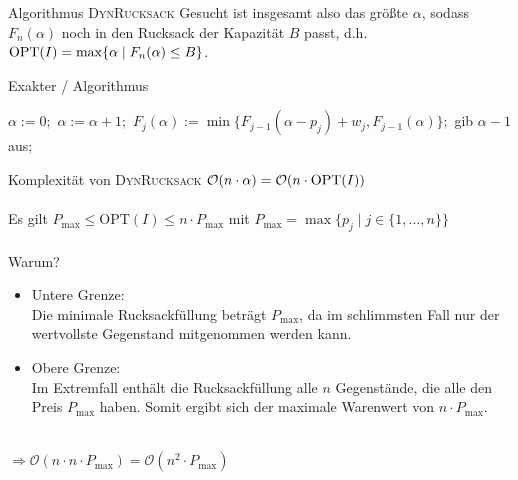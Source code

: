 \begin{frame}{Algorithmus \textsc{DynRucksack}}
    Gesucht ist insgesamt also das größte $\alpha$, sodass $F_n(\alpha)$ noch in den Rucksack der Kapazität $B$
    passt, d.h. $\operatorname{OPT}(I)=\max\{ \alpha \mid F_n(\alpha) \leq B \}$.
    
\begin{algorithm}[H]
    \caption{Exakter \rucksack/ Algorithmus}
        \begin{algorithmic}
            \State $\alpha:=0;$
            \Repeat
            \State $\alpha:=\alpha+1;$
            \State $F_j(\alpha):=\min\{F_{j-1}(\alpha-p_j)+w_j,F_{j-1}(\alpha)\};$
            \EndFor
            \State gib $\alpha-1$ aus$;$
        \end{algorithmic}
\end{algorithm}



\end{frame}
\begin{frame}{Komplexität von \textsc{DynRucksack}}
    $\mathcal{O}( n \cdot \alpha) = \mathcal{O}( n \cdot \operatorname{OPT}(I))$ \\~\\
    \pause    
    Es gilt $P_{\text{max}} \leq \text{OPT}(I) \leq n \cdot P_{\text{max}}$ 
    \quad mit $P_{\text{max}}=\max\{p_j \mid j \in \{1,...,n\}\}$ \\~\\
    \pause
    Warum?
    \begin{itemize}
        \item Untere Grenze: \\ Die minimale Rucksackfüllung beträgt $P_{\text{max}}$, da im schlimmsten Fall nur der wertvollste Gegenstand mitgenommen werden kann.
        \item Obere Grenze:  \\ Im Extremfall enthält die Rucksackfüllung alle $n$ Gegenstände, die alle den Preis $P_{\text{max}}$ haben. Somit ergibt sich der maximale Warenwert von $n \cdot P_{\text{max}}$.
    \end{itemize} ~\\
    
    $\Rightarrow \mathcal{O}( n \cdot n \cdot P_{\max}) = \mathcal{O}( n^2 \cdot P_{\max})$    
\end{frame}
